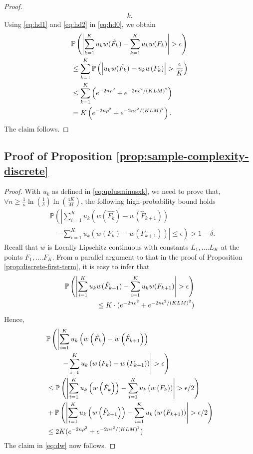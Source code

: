 \begin{proof}
\begin{align}
    k.\label{eq:hd2}
\end{align}
Using \eqref{eq:hd1} and \eqref{eq:hd2} in \eqref{eq:hd0}, we obtain
\begin{align*}
& \mathbb{P}\left( \left| \sum_{k=1}^K u_k w(\hat{F_k}) - \sum_{k=1}^K u_k w(F_k) \right| >\epsilon \right)\\
 & \leq
\sum_{k=1}^K \mathbb{P}\left( \left| u_k w(\hat{F_k}) -u_k w(F_k) \right| > \frac {\epsilon} {K} \right) \\ 
& \le \sum_{k=1}^K \left( e^{-2n\rho^2} + e^{-2n\epsilon^2  / (KLM)^2} \right) \\ 
& =K    \left(e^{-2n\rho^2} + e^{-2n\epsilon^2 / (KLM)^2}\right).
\end{align*}
The claim follows.
\end{proof}

\subsection*{Proof of Proposition \ref{prop:sample-complexity-discrete}}
\begin{proof}
With $u_k$ as defined in \eqref{eq:uplusminusxk}, we need to prove that, $\forall n \ge \frac{1}{\kappa}\ln\!\left(\frac{1}{\delta}\right) \ln\left(\frac{4K}{M}\right)\!$, the following high-probability bound holds
\begin{align}
&\mathbb{P}\left(\left|\sum_{i=1}^K u_{k} \left(w\left(\hat{F_k}\right)- w\left(\hat F_{k+1}\right) \right)\right.\right.\nonumber\\
&\quad\left.\left.-  
\sum_{i=1}^K u_{k} \left(w\left(F_k\right)- w\left(F_{k+1}\right) \right)
\right| \leq \epsilon\right) > 1-\delta.
\label{eq:dw}
\end{align}
Recall that $w$ is Locally Lipschitz continuous with constants $L_1,....L_K$ at the points $F_1,....F_K$.
From a parallel argument to that in the proof of Proposition \ref{prop:discrete-first-term}, it is easy to infer that
\begin{align*}
\mathbb{P}\left( \left| \sum_{i=1}^K u_k w(\hat F_{k+1}) - \sum_{i=1}^K u_k w(F_{k+1}) \right| >\epsilon \right)\\
\le
K\cdot ( e^{-2n\rho^2 } + e^{-2n\epsilon^2 /(KLM)^2})
\end{align*}
Hence,
\begin{align*}
& \mathbb{P}\left(\left|\sum_{i=1}^K u_k \left(w\left(\hat{F_k}\right)- w\left(\hat F_{k+1}\right) \right)\right.\right.\\
&\qquad\left.\left. -  \sum_{i=1}^K u_k \left(w\left(F_k\right)-
w\left(F_{k+1}\right) \right) \right| > \epsilon\right) \\ 
&\leq  \mathbb{P}\left( \left|\sum_{i=1}^K u_k \left(w\left(\hat{F_k}\right)\right) -
    \sum_{i=1}^K u_k \left(w\left(F_k\right)\right) \right| > \epsilon/2 \right) \\
		&+ \mathbb{P}\left( \left|\sum_{i=1}^K u_k
    \left(w\left(\hat F_{k+1}\right)\right) -  \sum_{i=1}^K u_k \left(w\left(F_{k+1}\right)\right) \right| > \epsilon/2 \right) \\ 
		&\leq  2K
    (e^{-2n\rho^2} + e^{-2n\epsilon^2/(KLM)^2})
\end{align*}
The claim in \eqref{eq:dw} now follows.
\end{proof}
